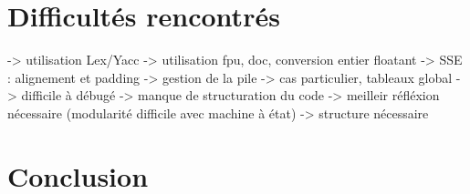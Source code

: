 \documentclass{article}
\begin{document}
\section{Difficultés rencontrés}
-> utilisation Lex/Yacc
-> utilisation fpu, doc, conversion entier floatant
-> SSE : alignement et padding
-> gestion de la pile
-> cas particulier, tableaux global
-> difficile à débugé
-> manque de structuration du code -> meilleir réfléxion nécessaire (modularité difficile avec machine à état) -> structure nécessaire

\section{Conclusion}
\end{document}
